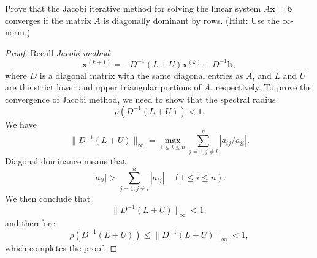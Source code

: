 \begin{pro}
  Prove that the Jacobi iterative method for solving the linear system
  $A\mathbf{x}=\mathbf{b}$ converges if the matrix $A$
  is diagonally dominant by rows.
  (Hint: Use the $\infty$-norm.)
\end{pro}
\begin{proof}
  Recall \emph{Jacobi method}:
  \begin{displaymath}
    \mathbf{x}^{(k+1)} = -D^{-1}(L+U)\mathbf{x}^{(k)}
    + D^{-1}\mathbf{b},
  \end{displaymath}
  where $D$ is a diagonal matrix with the same diagonal entries
  as $A$, and $L$ and $U$ are the strict lower and upper
  triangular portions of $A$, respectively.
  To prove the convergence of Jacobi method,
  we need to show that the spectral radius
  \begin{displaymath}
    \rho(D^{-1}(L+U))<1.
  \end{displaymath}
  We have
  \begin{displaymath}
    \|D^{-1}(L+U)\|_{\infty} = \max_{1\le i\le n}\sum_{j=1, j\ne i}^n
    |a_{ij}/a_{ii}|.
  \end{displaymath}
  Diagonal dominance means that
  \begin{displaymath}
    |a_{ii}| > \sum_{j=1,j\ne i}^n|a_{ij}| \quad
    (1\le i\le n).
  \end{displaymath}
  We then conclude that
  \begin{displaymath}
    \|D^{-1}(L+U)\|_{\infty} < 1,
  \end{displaymath}
  and therefore
  \begin{displaymath}
    \rho(D^{-1}(L+U)) \le \|D^{-1}(L+U)\|_{\infty} < 1,
  \end{displaymath}
  which completes the proof.
\end{proof}
